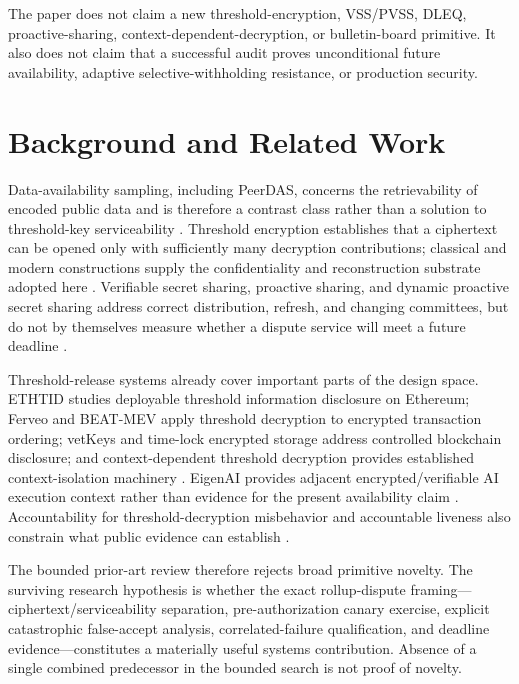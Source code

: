 \documentclass[10pt]{article}
\begin{document}
The paper does not claim a new threshold-encryption, VSS/PVSS, DLEQ, proactive-sharing, context-dependent-decryption, or bulletin-board primitive. It also does not claim that a successful audit proves unconditional future availability, adaptive selective-withholding resistance, or production security.

\section{Background and Related Work}

Data-availability sampling, including PeerDAS, concerns the retrievability of encoded public data and is therefore a contrast class rather than a solution to threshold-key serviceability \citep{eip7594}. Threshold encryption establishes that a ciphertext can be opened only with sufficiently many decryption contributions; classical and modern constructions supply the confidentiality and reconstruction substrate adopted here \citep{boneh2006threshold}. Verifiable secret sharing, proactive sharing, and dynamic proactive secret sharing address correct distribution, refresh, and changing committees, but do not by themselves measure whether a dispute service will meet a future deadline \citep{schoenmakers1999pvss,herzberg1995proactive,yurek2023dpss}.

Threshold-release systems already cover important parts of the design space. ETHTID studies deployable threshold information disclosure on Ethereum; Ferveo and BEAT-MEV apply threshold decryption to encrypted transaction ordering; vetKeys and time-lock encrypted storage address controlled blockchain disclosure; and context-dependent threshold decryption provides established context-isolation machinery \citep{stengele2021ethtid,bebel2022ferveo,bormet2025epochless,cerulli2023vetkeys,agarwal2025ttles,boneh2025context}. EigenAI provides adjacent encrypted/verifiable AI execution context rather than evidence for the present availability claim \citep{eigenai2026}. Accountability for threshold-decryption misbehavior and accountable liveness also constrain what public evidence can establish \citep{boneh2023accountability,lewis2025accountable}.

The bounded prior-art review therefore rejects broad primitive novelty. The surviving research hypothesis is whether the exact rollup-dispute framing---ciphertext/serviceability separation, pre-authorization canary exercise, explicit catastrophic false-accept analysis, correlated-failure qualification, and deadline evidence---constitutes a materially useful systems contribution. Absence of a single combined predecessor in the bounded search is not proof of novelty.
\end{document}
